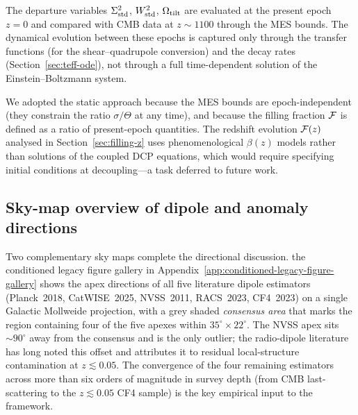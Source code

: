 The departure variables $\Sigma^2_{\mathrm{std}}$, $W^2_{\mathrm{std}}$, $\Omega_{\mathrm{tilt}}$ are
evaluated at the present epoch $z = 0$ and compared with CMB
data at $z \sim 1100$ through the MES bounds.  The dynamical
evolution between these epochs is captured only through the
transfer functions (for the shear--quadrupole conversion) and
the decay rates (Section~\ref{sec:teff-ode}), not through a
full time-dependent solution of the Einstein--Boltzmann system.

We adopted the static approach because the MES bounds are
epoch-independent (they constrain the ratio $\sigma/\Theta$ at
any time), and because the filling fraction $\mathcal{F}$ is defined as
a ratio of present-epoch quantities.  The redshift evolution
$\mathcal{F}(z)$ analysed in Section~\ref{sec:filling-z} uses
phenomenological $\beta(z)$ models rather than solutions of the
coupled DCP equations, which would require specifying initial
conditions at decoupling---a task deferred to future work.






\subsection{Sky-map overview of dipole and anomaly directions}
\label{sec:sky-map-overview}

Two complementary sky maps complete the directional discussion.
the conditioned legacy figure gallery in Appendix~\ref{app:conditioned-legacy-figure-gallery} shows the apex
directions of all five literature dipole estimators
(Planck~2018, CatWISE~2025, NVSS~2011, RACS~2023, CF4~2023) on a
single Galactic Mollweide projection, with a grey shaded
\emph{consensus area} that marks the region containing four of the
five apexes within $35^{\circ} \times 22^{\circ}$.  The NVSS apex sits
$\sim 90^{\circ}$ away from the consensus and is the only outlier;
the radio-dipole literature has long noted this offset and attributes
it to residual local-structure contamination at $z \lesssim 0.05$.
The convergence of the four remaining estimators across more than
six orders of magnitude in survey depth (from CMB last-scattering
to the $z \lesssim 0.05$ CF4 sample) is the key empirical input
to the framework.

